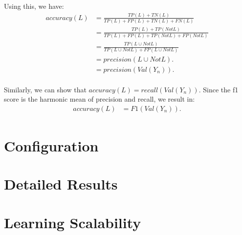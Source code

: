 Using this, we have:
\begin{equation*}
\begin{split}
  \mathit{accuracy}(L)&=\frac{TP(L)+TN(L)}{TP(L)+FP(L)+TN(L)+FN(L)}\\
  &=\frac{TP(L)+TP(\mathit{NotL})}{TP(L)+FP(L)+TP(\mathit{NotL})+FP(\mathit{NotL})}\\
  &=\frac{TP(L\cup\mathit{NotL})}{TP(L\cup\mathit{NotL})+FP(L\cup\mathit{NotL})}\\
  &=\mathit{precision}(L\cup\mathit{NotL}).\\
  &=\mathit{precision}(\textit{Val}(Y_n)).\\
\end{split}
\end{equation*}

Similarly, we can show that $\mathit{accuracy}(L)=\mathit{recall}(\textit{Val}(Y_n))$.
Since the \gls{f1 score} is the harmonic mean of \gls{precision} and \gls{recall}, we result in:
\begin{equation*}
\begin{split}
  \mathit{accuracy}(L)&=\textit{F1}(\textit{Val}(Y_n)).\\
\end{split}
\end{equation*}

\section{Configuration}\label{app:sec-configuration}


\section{Detailed Results}\label{app:detailed-results}


\section{Learning Scalability}\label{app:learning-scalability}

